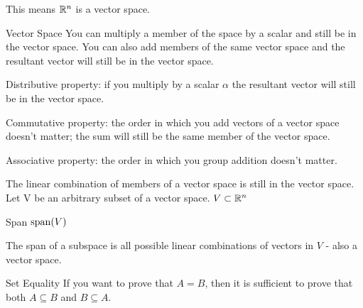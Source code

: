 \documentclass[11pt]{article}
\begin{document}
This means $\mathbb R^n$ is a vector space.




\begin{definition}{Vector Space}
You can multiply a member of the space by a scalar and still be in the vector space.
You can also add members of the same vector space and the resultant vector will still be in the vector space.

Distributive property: if you multiply by a scalar $\alpha$ the resultant vector will still be in the vector space.

Commutative property: the order in which you add vectors of a vector space doesn't matter; the sum will still be the same member of the vector space.

Associative property: the order in which you group addition doesn't matter.
\end{definition}

The linear combination of members of a vector space is still in the vector space.
Let V be an arbitrary subset of a vector space.
$V \subset \mathbb{R}^n$

\begin{definition}{Span}
  $\operatorname{span}(V)$

  The span of a subspace is all possible linear combinations of vectors in $V$ - also a vector space.
\end{definition}


\begin{definition}{Set Equality}
  If you want to prove that $A = B$, then it is sufficient to prove that both $A \subseteq B$ and $B \subseteq A$.
\end{definition}
\end{document}
